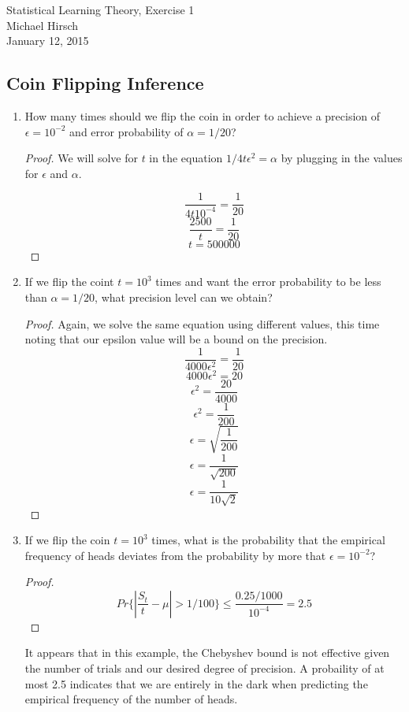 \documentclass[]{book}
\theoremstyle{definition}
\begin{document}
\begin{center}
{\Large Statistical Learning Theory, Exercise 1}\\
Michael Hirsch\\ %
January 12, 2015 %
\end{center}

\vspace{0.2 cm}


\subsection*{Coin Flipping Inference}

\begin{enumerate}
\item\label{norms}
How many times should we flip the coin in order to achieve a precision of $\epsilon = 10^{-2}$ and error probability of $\alpha = 1/20$?
\begin{proof}
	We will solve for $t$ in the equation $1/4t\epsilon^{2} = \alpha$ by plugging in the values for $\epsilon$ and $\alpha$.

	$$ \dfrac{1}{4t10^{-4}} = \dfrac{1}{20}$$
	$$ \dfrac{2500}{t} = \dfrac{1}{20}$$
	$$ t = 500000$$
\end{proof}

\item	If we flip the coint $ t = 10^{3}$ times and want the error probability to be less than $\alpha = 1/20$, what precision level can we obtain?
\begin{proof} Again, we solve the same equation using different values, this time noting that our epsilon value will be a bound on the precision.
	$$ \dfrac{1}{4000\epsilon^{2}} = \dfrac{1}{20}$$
	$$ 4000\epsilon^{2} = 20 $$
	$$ \epsilon ^{2} = \dfrac{20}{4000}$$
	$$ \epsilon ^{2} = \dfrac{1}{200}$$
	$$ \epsilon  = \sqrt{\dfrac{1}{200}}$$
	$$ \epsilon  = \dfrac{1}{\sqrt{200}}$$
	$$ \epsilon  = \dfrac{1}{10\sqrt{2}}$$
\end{proof}

\item	If we flip the coin $t = 10^{3}$ times, what is the probability that the empirical frequency of heads deviates from the probability by more that $\epsilon = 10 ^ {-2}$?
\begin{proof}
		$$ Pr\{| \dfrac{S_{t}}{t} - \mu | > 1/100 \} \leq \dfrac{0.25/1000}{10^{-4}} = 2.5$$
		
\end{proof}

It appears that in this example, the Chebyshev bound is not effective given the number of trials and our desired degree of precision. A probaility of at most 2.5 indicates that we are entirely in the dark when predicting the empirical frequency of the number of heads.

\end{enumerate}
\end{document}

